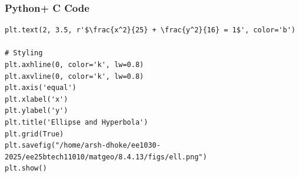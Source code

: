 \documentclass{beamer}
\begin{document}
\begin{frame}[fragile]
    \frametitle{Python+ C Code}
\begin{lstlisting}
plt.text(2, 3.5, r'$\frac{x^2}{25} + \frac{y^2}{16} = 1$', color='b')

# Styling
plt.axhline(0, color='k', lw=0.8)
plt.axvline(0, color='k', lw=0.8)
plt.axis('equal')
plt.xlabel('x')
plt.ylabel('y')
plt.title('Ellipse and Hyperbola')
plt.grid(True)
plt.savefig("/home/arsh-dhoke/ee1030-2025/ee25btech11010/matgeo/8.4.13/figs/ell.png")
plt.show()

\end{lstlisting}
\end{frame}
\end{document}
